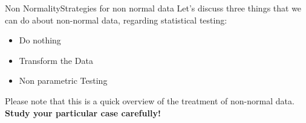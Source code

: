 

\begin{frame}{Non Normality}{Strategies for non normal data}
  Let's discuss three things that we can do about non-normal data,
  regarding statistical testing:\bigskip

  \begin{itemize}
    \item Do nothing
    \item Transform the Data
    \item Non parametric Testing
  \end{itemize}\bigskip

  Please note that this is a quick overview of the treatment of non-normal data.
  {\bf Study your particular case carefully!}
\end{frame}

%
%
%



